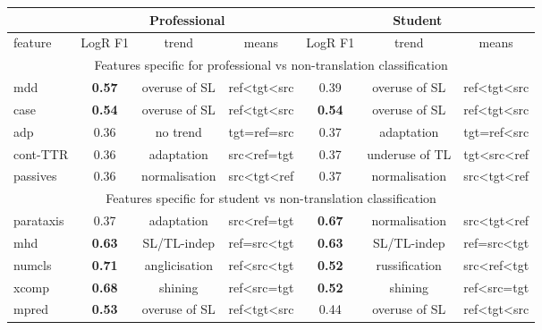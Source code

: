 

\begin{longtable}[H]{p{1.84cm}|ccc||ccc}
	\toprule
	&      \multicolumn{3}{c}{Professional} 	&      \multicolumn{3}{c}{Student}\\
	\midrule
	feature & LogR F1 & trend & means   & LogR F1 & trend   & means   \\
	\midrule
	\multicolumn{7}{c}{Features specific for professional vs non-translation classification} \\
	\midrule
	mdd           & \textbf{0.57} & overuse of SL & ref\textless{}tgt\textless{}src & 0.39 & overuse of SL  & ref\textless{}tgt\textless{}src \\
	case          & \textbf{0.54} & overuse of SL & ref\textless{}tgt\textless{}src & \textbf{0.54} & overuse of SL  & ref\textless{}tgt\textless{}src \\
	adp           & 0.36 & no trend       & tgt=ref=src                     & 0.37 & adaptation     & tgt=ref\textless{}src           \\
	cont-TTR  & 0.36 & adaptation    & src\textless{}ref=tgt           & 0.37 & underuse of TL & tgt\textless{}src\textless{}ref \\
	passives      & 0.36 & normalisation & src\textless{}tgt\textless{}ref & 0.37 & normalisation  & src\textless{}tgt\textless{}ref \\
	\midrule
	\multicolumn{7}{c}{Features specific for student vs non-translation classification} \\
	\midrule
	parataxis     & 0.37 & adaptation    & src\textless{}ref=tgt           & \textbf{0.67} & normalisation & src\textless{}tgt\textless{}ref \\
	mhd           & \textbf{0.63} & SL/TL-indep   & ref=src\textless{}tgt           & \textbf{0.63} & SL/TL-indep   & ref=src\textless{}tgt           \\
	numcls        & \textbf{0.71} & anglicisation & ref\textless{}src\textless{}tgt & \textbf{0.52} & russification & src\textless{}ref\textless{}tgt \\
	xcomp         & \textbf{0.68} & shining       & ref\textless{}src=tgt           & \textbf{0.52} & shining       & ref\textless{}src=tgt           \\
	mpred         & \textbf{0.53} & overuse of SL & ref\textless{}tgt\textless{}src & 0.44 & overuse of SL & ref\textless{}tgt\textless{}src \\

\end{longtable}
